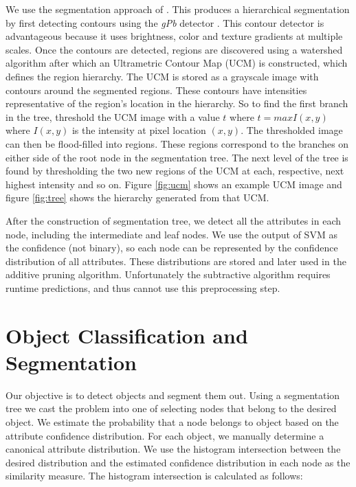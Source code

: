 \documentclass[10pt,twocolumn,letterpaper]{article}
\begin{document}
We use the segmentation approach of \cite{arbelaez09}.  This
produces a hierarchical segmentation by first detecting contours
using the \emph{gPb} detector \cite{maire08}.  This contour detector
is advantageous because it uses brightness, color and texture
gradients at multiple scales.  Once the contours are
detected, regions are discovered using a watershed algorithm after
which an Ultrametric Contour Map (UCM) is constructed, which defines
the region hierarchy.  The UCM is stored as a grayscale image with
contours around the segmented regions.  These contours have intensities
representative of the region's location in the hierarchy.  So to find
the first branch in the tree, threshold the UCM image with a value
$t$ where $t = max{I(x,y)}$ where $I(x,y)$ is the intensity at pixel
location $(x,y)$.  The thresholded image can then be flood-filled into
regions.  These regions correspond to the branches on either side of
the root node in the segmentation tree.  The next level of the tree is
found by thresholding the two new regions of the UCM at each, respective,
next highest intensity and so on.
Figure \ref{fig:ucm} shows an example UCM image and figure \ref{fig:tree}
shows the hierarchy generated from that UCM.

After the construction of segmentation tree, we detect all
the attributes in each node, including the intermediate and
leaf nodes. We use the output of SVM as the confidence (not binary),
so each node can be represented by the confidence distribution of
all attributes.  These distributions are stored and later used in
the additive pruning algorithm.  Unfortunately the subtractive algorithm
requires runtime predictions, and thus cannot use this preprocessing
step.



\section{Object Classification and Segmentation}
\label{sec:detection}

Our objective is to detect objects and segment them out. Using a segmentation tree
we cast the problem into one of selecting nodes that belong 
to the desired object. We estimate the
probability that a node belongs to object based on the attribute
confidence distribution. For each object, we manually determine a
canonical attribute distribution.  We use the
histogram intersection between the desired distribution and the
estimated confidence distribution in each node as the similarity
measure. The histogram intersection is calculated as follows:
\end{document}
